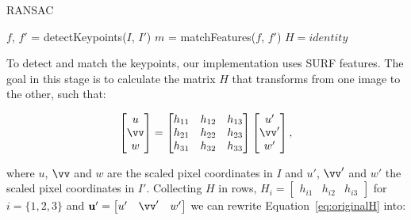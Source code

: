 \documentclass[12pt]{article}
\begin{document}
\begin{algorithm}[H]
 \caption{RANSAC}
 $f$, $f'$ = detectKeypoints($I$, $I'$)\;
 $m$ = matchFeatures($f$, $f'$)\;
 $H = identity$\;
\end{algorithm}

To detect and match the keypoints, our implementation uses SURF features.
The goal in this stage is to calculate the matrix $H$ that transforms from one image to the other, such that:

\begin{equation}
\begin{bmatrix}
u \\ 
\vv \\ 
w
\end{bmatrix}
= 
\begin{bmatrix}
 h_{11} & h_{12} & h_{13} \\ 
 h_{21} & h_{22} & h_{23}\\ 
 h_{31} & h_{32} & h_{33}
\end{bmatrix}
\begin{bmatrix}
u' \\
\vv' \\
w'
\end{bmatrix},
\label{eq:originalH}
\end{equation}

where $u$, $\vv$ and $w$ are the scaled pixel coordinates in $I$ and $u'$, $\vv'$ and $w'$ the scaled pixel coordinates in $I'$.
Collecting $H$ in rows, $H_i = \begin{bmatrix} h_{i1} & h_{i2} & h_{i3} \end{bmatrix}$ for $i = \lbrace 1,2,3 \rbrace$ and $\mathbf{u'} = \begin{bmatrix} u' & \vv' & w' \end{bmatrix}$ we can rewrite Equation~\ref{eq:originalH} into:
\end{document}
